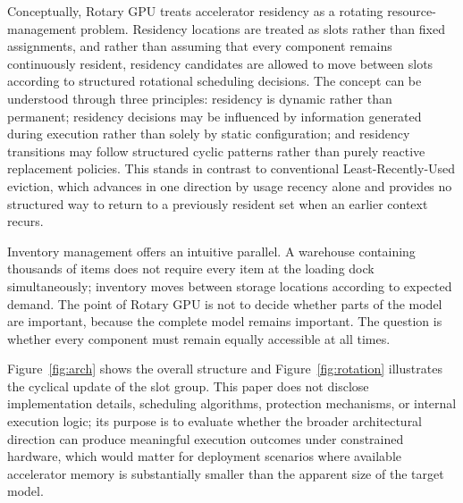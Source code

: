 \documentclass[11pt]{article}
\begin{document}
Conceptually, Rotary GPU treats accelerator residency as a rotating resource-management problem. Residency locations are treated as slots rather than fixed assignments, and rather than assuming that every component remains continuously resident, residency candidates are allowed to move between slots according to structured rotational scheduling decisions. The concept can be understood through three principles: residency is dynamic rather than permanent; residency decisions may be influenced by information generated during execution rather than solely by static configuration; and residency transitions may follow structured cyclic patterns rather than purely reactive replacement policies. This stands in contrast to conventional Least-Recently-Used eviction, which advances in one direction by usage recency alone and provides no structured way to return to a previously resident set when an earlier context recurs.

Inventory management offers an intuitive parallel. A warehouse containing thousands of items does not require every item at the loading dock simultaneously; inventory moves between storage locations according to expected demand. The point of Rotary GPU is not to decide whether parts of the model are important, because the complete model remains important. The question is whether every component must remain equally accessible at all times.

Figure~\ref{fig:arch} shows the overall structure and Figure~\ref{fig:rotation} illustrates the cyclical update of the slot group. This paper does not disclose implementation details, scheduling algorithms, protection mechanisms, or internal execution logic; its purpose is to evaluate whether the broader architectural direction can produce meaningful execution outcomes under constrained hardware, which would matter for deployment scenarios where available accelerator memory is substantially smaller than the apparent size of the target model.
\end{document}
